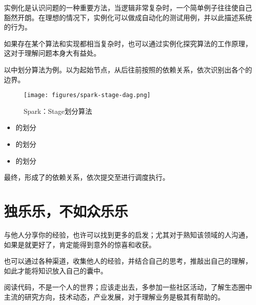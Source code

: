 \begin{content}

实例化是认识问题的一种重要方法，当逻辑非常复杂时，一个简单例子往往使自己豁然开朗。在理想的情况下，实例化可以做成自动化的测试用例，并以此描述系统的行为。

如果存在某个算法和实现都相当复杂时，也可以通过实例化探究算法的工作原理，这对于理解问题本身大有益处。

以中划分算法为例。以为起始节点，从后往前按照的依赖关系，依次识别出各个的边界。

\begin{figure}[!htbp]
\centering
\texttt{[image: figures/spark-stage-dag.png]}
\caption{Spark：Stage划分算法}
 \label{fig:spark-stage-dag}
\end{figure}

\begin{itemize}
 \item {}的划分
   \begin{enum}
   \end{enum}

 \item {}的划分
   \begin{enum}
   \end{enum}
 \item {}的划分
   \begin{enum}
   \end{enum} 
\end{itemize}

最终，形成了的依赖关系，依次提交至进行调度执行。

\end{content}

\section{独乐乐，不如众乐乐}

\begin{content}

与他人分享你的经验，也许可以找到更多的启发；尤其对于熟知该领域的人沟通，如果是就更好了，肯定能得到意外的惊喜和收获。

也可以通过各种渠道，收集他人的经验，并结合自己的思考，推敲出自己的理解，如此才能将知识放入自己的囊中。

阅读代码，不是一个人的世界；应该走出去，多参加一些社区活动，了解生态圈中主流的研究方向，技术动态，产业发展，对于理解业务是极其有帮助的。


\end{content}

